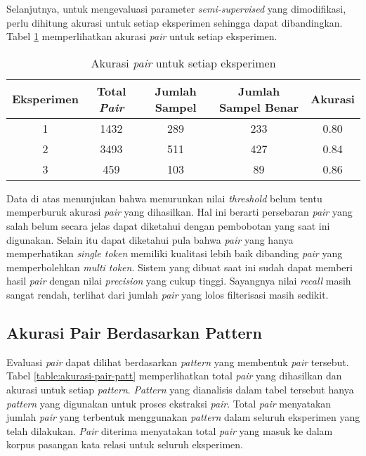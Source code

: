 Selanjutnya, untuk mengevaluasi parameter \textit{semi-supervised} yang dimodifikasi, perlu dihitung akurasi untuk setiap eksperimen sehingga dapat dibandingkan. Tabel \ref{table:akurasi-all} memperlihatkan akurasi \textit{pair} untuk setiap eksperimen.

\begin{table}
  \centering
  \caption{Akurasi \textit{pair} untuk setiap eksperimen}
  \label{table:akurasi-all}
  \begin{tabular}{|c|c|c|c|c|}
  \hline
  Eksperimen & Total \textit{Pair} & Jumlah Sampel & Jumlah Sampel Benar & Akurasi \\ \hline
  1 & 1432 & 289 & 233 & 0.80 \\ \hline
  2 & 3493 & 511 & 427 & 0.84 \\ \hline
  3 & 459  & 103 & 89  & 0.86 \\ \hline
  \end{tabular} 
\end{table}

Data di atas menunjukan bahwa menurunkan nilai \textit{threshold} belum tentu memperburuk akurasi \textit{pair} yang dihasilkan. Hal ini berarti persebaran \textit{pair} yang salah belum secara jelas dapat diketahui dengan pembobotan yang saat ini digunakan. Selain itu dapat diketahui pula bahwa \textit{pair} yang hanya memperhatikan \textit{single token} memiliki kualitasi lebih baik dibanding \textit{pair} yang memperbolehkan \textit{multi token}. Sistem yang dibuat saat ini sudah dapat memberi hasil \textit{pair} dengan nilai \textit{precision} yang cukup tinggi. Sayangnya nilai \textit{recall} masih sangat rendah, terlihat dari jumlah \textit{pair} yang lolos filterisasi masih sedikit.

\subsection{Akurasi Pair Berdasarkan Pattern}
Evaluasi \textit{pair} dapat dilihat berdasarkan \textit{pattern} yang membentuk \textit{pair} tersebut. Tabel \ref{table:akurasi-pair-patt} memperlihatkan total \textit{pair} yang dihasilkan dan akurasi untuk setiap \textit{pattern}. \textit{Pattern} yang dianalisis dalam tabel tersebut hanya \textit{pattern} yang digunakan untuk proses ekstraksi \textit{pair}. Total \textit{pair} menyatakan jumlah \textit{pair} yang terbentuk menggunakan \textit{pattern} dalam seluruh eksperimen yang telah dilakukan. \textit{Pair} diterima menyatakan total \textit{pair} yang masuk ke dalam korpus pasangan kata relasi untuk seluruh eksperimen.

